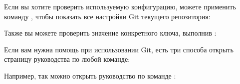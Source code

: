 \documentclass[letterpaper,10pt,russian]{sphinxmanual}
\begin{document}
\sphinxAtStartPar
{}

\sphinxAtStartPar
Если вы хотите проверить используемую конфигурацию, можете применить команду , чтобы показать все настройки Git текущего репозитория:

\begin{sphinxVerbatim}[commandchars=\\\{\}]
  
 
\end{sphinxVerbatim}

\sphinxAtStartPar
Также вы можете проверить значение конкретного ключа, выполнив :

\begin{sphinxVerbatim}[commandchars=\\\{\}]
  
 
\end{sphinxVerbatim}

\sphinxAtStartPar
Если вам нужна помощь при использовании Git, есть три способа открыть страницу руководства по любой команде:

\begin{sphinxVerbatim}[commandchars=\\\{\}]
  
  
\end{sphinxVerbatim}

\sphinxAtStartPar
Например, так можно открыть руководство по команде :

\begin{sphinxVerbatim}[commandchars=\\\{\}]
  
\end{sphinxVerbatim}
\end{document}
